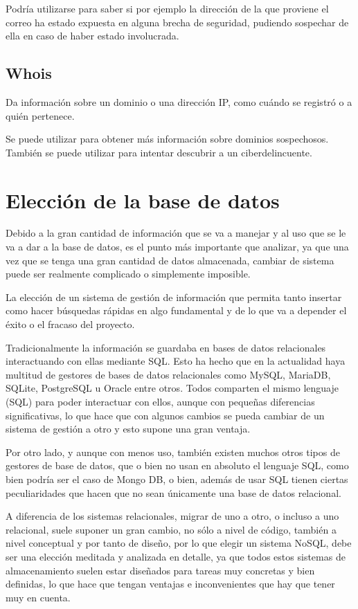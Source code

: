 Podría utilizarse para saber si por ejemplo la dirección de la que proviene el correo ha estado expuesta en alguna brecha de seguridad, pudiendo sospechar de ella en caso de haber estado involucrada. 

\subsection{Whois}
Da información sobre un dominio o una dirección IP, como cuándo se registró o a quién pertenece.

Se puede utilizar para obtener más información sobre dominios sospechosos. También se puede utilizar para intentar descubrir a un ciberdelincuente. 

\section{Elección de la base de datos}
Debido a la gran cantidad de información que se va a manejar y al uso que se le va a dar a la base de datos, es el punto más importante que analizar, ya que una vez que se tenga una gran cantidad de datos almacenada, cambiar de sistema puede ser realmente complicado o simplemente imposible. 

La elección de un sistema de gestión de información que permita tanto insertar como hacer búsquedas rápidas en algo fundamental y de lo que va a depender el éxito o el fracaso del proyecto.

Tradicionalmente la información se guardaba en bases de datos relacionales interactuando con ellas mediante SQL. Esto ha hecho que en la actualidad haya multitud de gestores de bases de datos relacionales como MySQL\cite{MySQL}, MariaDB\cite{MariaDB}, SQLite\cite{SQLite}, PostgreSQL\cite{PostgreSQL} u Oracle\cite{Oracle} entre otros. Todos comparten el mismo lenguaje (SQL) para poder interactuar con ellos, aunque con pequeñas diferencias significativas, lo que hace que con algunos cambios se pueda cambiar de un sistema de gestión a otro y esto supone una gran ventaja.

Por otro lado, y aunque con menos uso, también existen muchos otros tipos de gestores de base de datos, que o bien no usan en absoluto el lenguaje SQL, como bien podría ser el caso de Mongo DB\cite{MongoDB}, o bien, además de usar SQL tienen ciertas peculiaridades que hacen que no sean únicamente una base de datos relacional. 

A diferencia de los sistemas relacionales, migrar de uno a otro, o incluso a uno relacional, suele suponer un gran cambio, no sólo a nivel de código, también a nivel conceptual y por tanto de diseño, por lo que elegir un sistema NoSQL, debe ser una elección meditada y analizada en detalle, ya que todos estos sistemas de almacenamiento suelen estar diseñados para tareas muy concretas y bien definidas, lo que hace que tengan ventajas e inconvenientes que hay que tener muy en cuenta.

